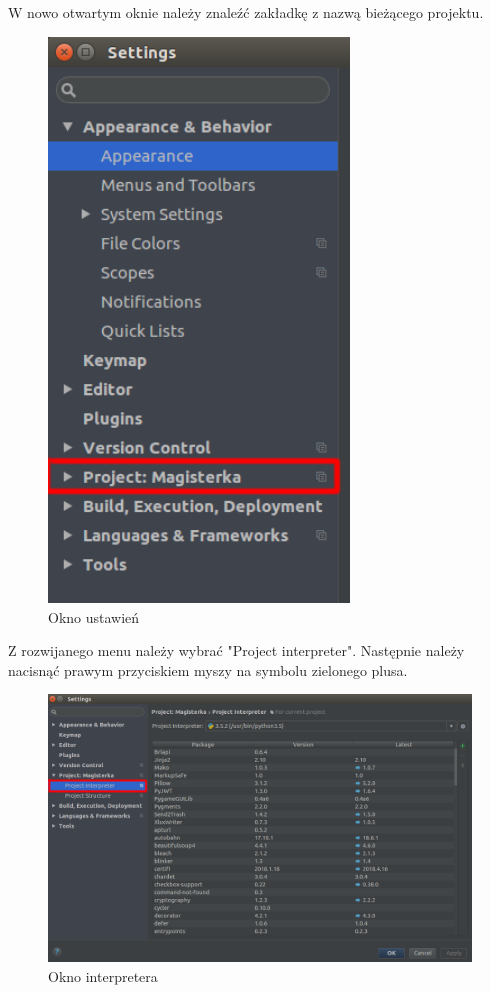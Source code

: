 W nowo otwartym oknie należy znaleźć zakładkę z nazwą bieżącego projektu.

\begin{figure}[h]
\centering
\includegraphics[width=8cm]{Zdjecia/5/kasia/settings2A}
\caption{Okno ustawień}
\label{fig:file}
\end{figure}

Z rozwijanego menu należy wybrać "Project interpreter". Następnie należy nacisnąć prawym przyciskiem myszy na symbolu zielonego plusa.

\begin{figure}[h]
\centering
\includegraphics[width=13cm]{Zdjecia/5/kasia/settings3}
\caption{Okno interpretera}
\label{fig:file}
\end{figure}


